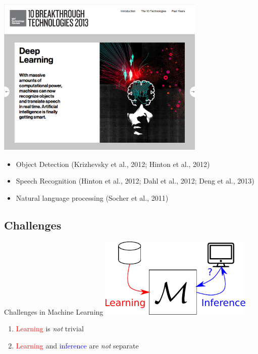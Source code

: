 \documentclass{beamer}
\newcommand{\tred}[1]{\textcolor{red}{#1}}
\newcommand{\tblue}[1]{\textcolor{blue}{#1}}
\begin{document}
\begin{frame}

\centering
\includegraphics[width=0.75\textwidth]{mit_breakthrough_deepl.png}

\begin{itemize}
\itemsep 0em
\item  Object Detection {\scriptsize (Krizhevsky et al., 2012; Hinton et al.,
        2012)} 
\item Speech Recognition {\scriptsize (Hinton et al., 2012; Dahl et al., 2012; Deng
        et al., 2013)} 
\item Natural language processing {\scriptsize (Socher et al., 2011)} 
\end{itemize}

\end{frame}

\subsection{Challenges}

\begin{frame}{Challenges in Machine Learning}
    \centering
    \includegraphics[width=0.55\textwidth]{machinelearning.pdf}

    \vspace{4mm}
    \raggedright
    \begin{enumerate}
        \item \tred{Learning} is \emph{not} trivial 
        \item \tred{Learning} and \tblue{inference} are \emph{not} separate
    \end{enumerate}
\end{frame}
\end{document}
